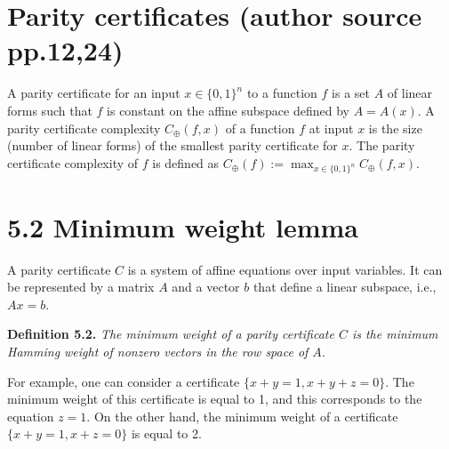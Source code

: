 \documentclass[10pt,a4paper]{article}
\newcommand{\bits}{\{0,1\}}
\newenvironment{originalresult}[1]{\par\medskip\noindent\textbf{#1.}\itshape}{\par\medskip}
\begin{document}
\section*{Parity certificates (author source pp.12,24)}
A parity certificate for an input $x\in\bits^n$ to a function $f$ is a set $A$ of linear forms such that $f$ is constant on the affine subspace defined by $A=A(x)$. A parity certificate complexity $C_\oplus(f,x)$ of a function $f$ at input $x$ is the size (number of linear forms) of the smallest parity certificate for $x$. The parity certificate complexity of $f$ is defined as $C_\oplus(f):=\max_{x\in\bits^n}C_\oplus(f,x)$.
\section*{5.2 Minimum weight lemma}
A parity certificate $C$ is a system of affine equations over input variables. It can be represented by a matrix $A$ and a vector $b$ that define a linear subspace, i.e., $Ax=b$.
\begin{originalresult}{Definition 5.2}
The minimum weight of a parity certificate $C$ is the minimum Hamming weight of nonzero vectors in the row space of $A$.
\end{originalresult}
For example, one can consider a certificate $\{x+y=1,x+y+z=0\}$. The minimum weight of this certificate is equal to 1, and this corresponds to the equation $z=1$. On the other hand, the minimum weight of a certificate $\{x+y=1,x+z=0\}$ is equal to 2.
\end{document}
